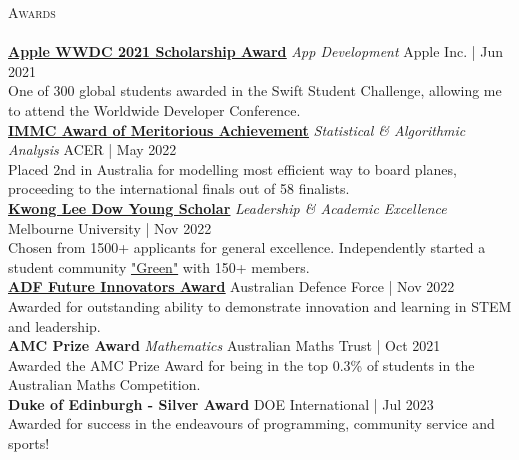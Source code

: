 \documentclass[a4paper]{article}
\newcommand{\lineunder} {
    \vspace*{-8pt} \\
    \hspace*{-10pt} \hrulefill \\
}
\newcommand{\header} [1] {
    {\hspace*{-10pt}\vspace*{6pt} \textsc{#1}}
    \vspace*{-6pt} \lineunder
}
\begin{document}
\header{Awards}
\href{https://www.wwdcscholars.com/s/DF1A5147-A993-44E4-8739-8A050139A7BA/2021}{\textbf{\ul{Apple WWDC 2021 Scholarship Award}}} \textit{App Development} \hfill Apple Inc. | Jun 2021\\
One of 300 global students awarded in the Swift Student Challenge, allowing me to attend the Worldwide Developer Conference.\\
\vspace*{1.5mm}
\href{https://www.acer.org/au/discover/article/bray-park-and-caulfield-grammar-schools-top-maths-challenge}{\textbf{\ul{IMMC Award of Meritorious Achievement}}} \textit{Statistical \& Algorithmic Analysis} \hfill ACER | May 2022\\
Placed 2nd in Australia for modelling most efficient way to board planes, proceeding to the international finals out of 58 finalists.\\
\vspace*{1.5mm}
\href{https://www.linkedin.com/posts/caulfield-grammar-school_caulfieldgrammar2022-activity-7001816876439781376-DZpH}{\textbf{\ul{Kwong Lee Dow Young Scholar}}} \textit{Leadership \& Academic Excellence} \hfill Melbourne University | Nov 2022\\
Chosen from 1500+ applicants for general excellence.
Independently started a student community \href{https://garv-shah.github.io/green/}{"Green"} with 150+ members.\\
\vspace*{1.5mm}
\href{https://adffutureinnovators.defencejobs.gov.au/schools/AwardsInformationSTEM.aspx}{\textbf{\ul{ADF Future Innovators Award}}} \hfill Australian Defence Force | Nov 2022\\
Awarded for outstanding ability to demonstrate innovation and learning in STEM and leadership.\\
\vspace*{1.5mm}
\textbf{AMC Prize Award} \textit{Mathematics} \hfill Australian Maths Trust | Oct 2021\\
Awarded the AMC Prize Award for being in the top 0.3\% of students in the Australian Maths Competition.\\
\vspace*{1.5mm}
\textbf{Duke of Edinburgh - Silver Award} \hfill DOE International | Jul 2023\\
Awarded for success in the endeavours of programming, community service and sports!\\
\vspace*{1.5mm}
\end{document}
